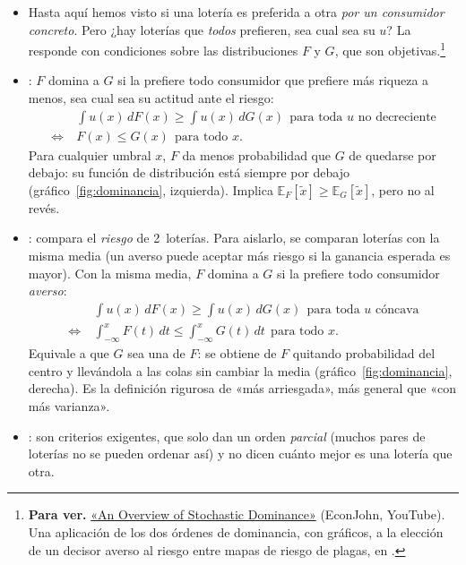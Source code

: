 \documentclass[11pt]{article}
\begin{document}
\begin{itemize}
\item Hasta aquí hemos visto si una lotería es preferida a otra \emph{por un consumidor concreto}. Pero ¿hay loterías que \emph{todos} prefieren, sea cual sea su $u$? La  responde con condiciones sobre las distribuciones $F$ y $G$, que son objetivas\nocite{HadarRussell1969Rules,HanochLevy1969Efficiency}.\footnote{\textbf{Para ver.} \href{https://www.youtube.com/watch?v=pNmX7g-FRrw}{«An Overview of Stochastic Dominance»} (EconJohn, YouTube). Una aplicación de los dos órdenes de dominancia, con gráficos, a la elección de un decisor averso al riesgo entre mapas de riesgo de plagas, en \textcite{Yemshanov2013Quantifying}.}
\item {}: $F$ domina a $G$ si la prefiere todo consumidor que prefiere más riqueza a menos, sea cual sea su actitud ante el riesgo:
  \begin{align*}
  &\int u(x)\,dF(x)\geq\int u(x)\,dG(x)\ \ \text{para toda } u \text{ no decreciente}\\
  \iff\ &F(x)\leq G(x)\ \ \text{para todo } x .
  \end{align*}
  Para cualquier umbral $x$, $F$ da menos probabilidad que $G$ de quedarse por debajo: su función de distribución está siempre por debajo (gráfico~\ref{fig:dominancia}, izquierda). Implica $\mathbb{E}_F[\tilde{x}]\geq\mathbb{E}_G[\tilde{x}]$, pero no al revés.
\item {}: compara el \emph{riesgo} de 2~loterías. Para aislarlo, se comparan loterías con la misma media (un averso puede aceptar más riesgo si la ganancia esperada es mayor). Con la misma media, $F$ domina a $G$ si la prefiere todo consumidor \emph{averso}:
  \begin{align*}
  &\int u(x)\,dF(x)\geq\int u(x)\,dG(x)\ \ \text{para toda } u \text{ cóncava}\\
  \iff\ &\int_{-\infty}^{x}F(t)\,dt\leq\int_{-\infty}^{x}G(t)\,dt\ \ \text{para todo } x .
  \end{align*}
  Equivale a que $G$ sea una  de $F$: se obtiene de $F$ quitando probabilidad del centro y llevándola a las colas sin cambiar la media (gráfico~\ref{fig:dominancia}, derecha). Es la definición rigurosa de «más arriesgada», más general que «con más varianza»\nocite{RothschildStiglitz1970Increasing}.
\item {}: son criterios exigentes, que solo dan un orden \emph{parcial} (muchos pares de loterías no se pueden ordenar así) y no dicen cuánto mejor es una lotería que otra.

\end{itemize}
\end{document}
